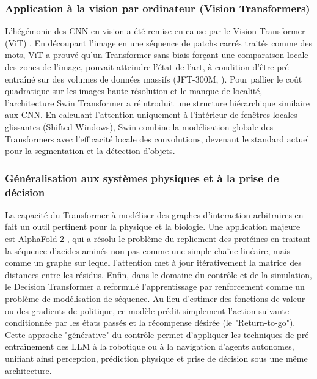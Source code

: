 \subsubsection{Application à la vision par ordinateur (Vision Transformers)}
L'hégémonie des CNN en vision a été remise en cause par le Vision Transformer (ViT) \cite{dosovitskiy_image_2020}. En découpant l'image en une séquence de patchs carrés traités comme des mots, ViT a prouvé qu'un Transformer sans biais forçant une comparaison locale des zones de l'image, pouvait atteindre l'état de l'art, à condition d'être pré-entraîné sur des volumes de données massifs (JFT-300M, \cite{sun_revisiting_2017}).
Pour pallier le coût quadratique sur les images haute résolution et le manque de localité, l'architecture Swin Transformer \cite{liu_swin_2021} a réintroduit une structure hiérarchique similaire aux CNN. En calculant l'attention uniquement à l'intérieur de fenêtres locales glissantes (Shifted Windows), Swin combine la modélisation globale des Transformers avec l'efficacité locale des convolutions, devenant le standard actuel pour la segmentation et la détection d'objets.

\subsubsection{Généralisation aux systèmes physiques et à la prise de décision}
La capacité du Transformer à modéliser des graphes d'interaction arbitraires en fait un outil pertinent pour la physique et la biologie. Une application majeure est AlphaFold 2 \cite{jumper_highly_2021}, qui a résolu le problème du repliement des protéines en traitant la séquence d'acides aminés non pas comme une simple chaîne linéaire, mais comme un graphe sur lequel l'attention met à jour itérativement la matrice des distances entre les résidus. 
Enfin, dans le domaine du contrôle et de la simulation, le Decision Transformer \cite{chen_decision_2021} a reformulé l'apprentissage par renforcement comme un problème de modélisation de séquence. Au lieu d'estimer des fonctions de valeur ou des gradients de politique, ce modèle prédit simplement l'action suivante conditionnée par les états passés et la récompense désirée (le "Return-to-go"). Cette approche "générative" du contrôle permet d'appliquer les techniques de pré-entraînement des LLM à la robotique ou à la navigation d'agents autonomes, unifiant ainsi perception, prédiction physique et prise de décision sous une même architecture.


